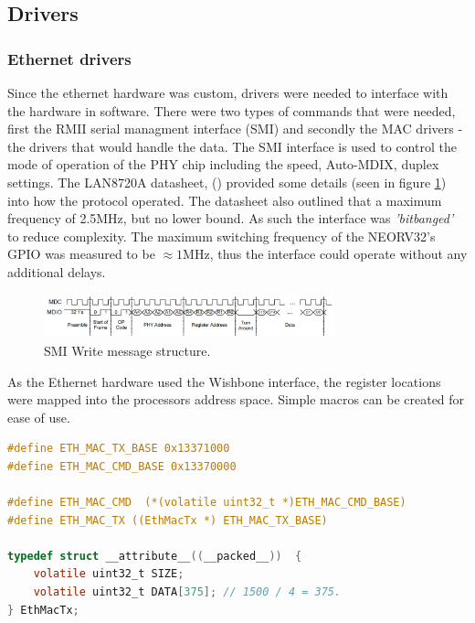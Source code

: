 \subsection{Drivers}
\subsubsection{Ethernet drivers}
Since the ethernet hardware was custom, drivers were needed to interface with the hardware in software. There were two types of commands that were needed, first the RMII serial managment interface (SMI) and secondly the MAC drivers - the drivers that would handle the data.  The SMI interface is used to control the mode of operation of the PHY chip including the speed, Auto-MDIX, duplex settings. The LAN8720A datasheet, (\cite{LAN8720ADatasheet}) provided some details (seen in figure \ref{fig:smi_packet_structure}) into how the protocol operated. The datasheet also outlined that a maximum frequency of 2.5MHz, but no lower bound. As such the interface was \textit{'bitbanged'} to reduce complexity. The maximum switching frequency of the NEORV32's GPIO was measured to be $\approx 1$MHz, thus the interface could operate without any additional delays.


\begin{figure}[h!]
    \centering
    \includegraphics[width=0.75\textwidth]{Images/SMIWriteStructure.png}
    \caption[SMI Write message structure]{SMI Write message structure. \cite{LAN8720ADatasheet}}
    \label{fig:smi_packet_structure}
\end{figure}


As the Ethernet hardware used the Wishbone interface, the register locations were mapped into the processors address space. Simple macros can be created for ease of use. 

\begin{lstlisting}[language=C, caption=Python example]
#define ETH_MAC_TX_BASE 0x13371000
#define ETH_MAC_CMD_BASE 0x13370000

#define ETH_MAC_CMD  (*(volatile uint32_t *)ETH_MAC_CMD_BASE)
#define ETH_MAC_TX ((EthMacTx *) ETH_MAC_TX_BASE)

typedef struct __attribute__((__packed__))  {
    volatile uint32_t SIZE;
    volatile uint32_t DATA[375]; // 1500 / 4 = 375.
} EthMacTx;
\end{lstlisting}






